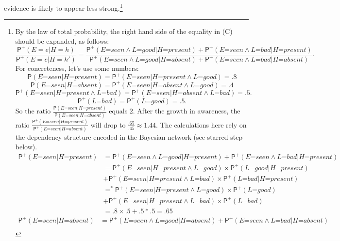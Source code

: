 \documentclass[
  11pt,
  dvipsnames,enabledeprecatedfontcommands]{scrartcl}
\newcommand{\pr}[1]{\ensuremath{\mathsf{P}(#1)}}
\newcommand{\ppr}[2]{\ensuremath{\mathsf{P}^{#1}(#2)}}
\begin{document}
evidence is likely to appear less strong.\footnote{By the law of total
  probability, the right hand side of the equality in (C) should be
  expanded, as follows:
  \[\frac{\ppr{+}{E=e \vert H=h}}{\ppr{+}{E=e \vert H=h'}}=\frac{\ppr{+}{\textit{E=seen} \wedge \textit{L=good} \vert \textit{H=present}}+\ppr{+}{\textit{E=seen} \wedge \textit{L=bad} \vert \textit{H=present}}}{\ppr{+}{\textit{E=seen} \wedge \textit{L=good} \vert \textit{H=absent}}+\ppr{+}{\textit{E=seen} \wedge \textit{L=bad} \vert \textit{H=absent}}}.\]
  For concreteness, let's use some numbers:
  \[\pr{\textit{E=seen} \vert \textit{H=present}}=\ppr{+}{\textit{E=seen} \vert \textit{H=present} \wedge \textit{L=good}}=.8\]
  \[\pr{\textit{E=seen} \vert \textit{H=absent}}=\ppr{+}{\textit{E=seen} \vert \textit{H=absent} \wedge \textit{L=good}}=.4\]
  \[\ppr{+}{\textit{E=seen} \vert \textit{H=present} \wedge \textit{L=bad}} = \ppr{+}{\textit{E=seen} \vert \textit{H=absent} \wedge \textit{L=bad}}=.5.\]
  \[\ppr{+}{\textit{L=bad}} = \ppr{+}{\textit{L=good}}=.5.\] So the
  ratio
  \(\frac{\pr{\textit{E=seen} \vert \textit{H=present}}}{\pr{\textit{E=seen} \vert \textit{H=absent}}}\)
  equals \(2\). After the growth in awareness, the ratio
  \(\frac{\ppr{+}{\textit{E=seen} \vert \textit{H=present}}}{\ppr{+}{\textit{E=seen} \vert \textit{H=absent}}}\)
  will drop to \(\frac{.65}{.45}\approx 1.44\). The calculations here
  rely on the dependency structure encoded in the Bayesian network (see
  starred step below). \begin{align*}
  \ppr{+}{\textit{E=seen} \vert \textit{H=present}} &= \ppr{+}{\textit{E=seen} \wedge \textit{L=good} \vert \textit{H=present}}+\ppr{+}{\textit{E=seen} \wedge \textit{L=bad} \vert \textit{H=present}}\\
  &= \ppr{+}{\textit{E=seen} \vert \textit{H=present} \wedge \textit{L=good}}  \times \ppr{+}{\textit{L=good} \vert  \textit{H=present} }\\ & +\ppr{+}{\textit{E=seen}  \vert \textit{H=present} \wedge \textit{L=bad}} \times \ppr{+}{\textit{L=bad} \vert  \textit{H=present}}\\
  &=^* \ppr{+}{\textit{E=seen} \vert \textit{H=present} \wedge \textit{L=good}}  \times \ppr{+}{\textit{L=good}}\\ & +\ppr{+}{\textit{E=seen}  \vert \textit{H=present} \wedge \textit{L=bad}} \times \ppr{+}{\textit{L=bad}}\\
  &= .8 \times .5 +.5 *.5 = .65 
  \end{align*} \begin{align*}
  \ppr{+}{\textit{E=seen} \vert \textit{H=absent}} &= \ppr{+}{\textit{E=seen} \wedge \textit{L=good} \vert \textit{H=absent}}+\ppr{+}{\textit{E=seen} \wedge \textit{L=bad} \vert \textit{H=absent}}\\

\end{align*}}
\end{document}
